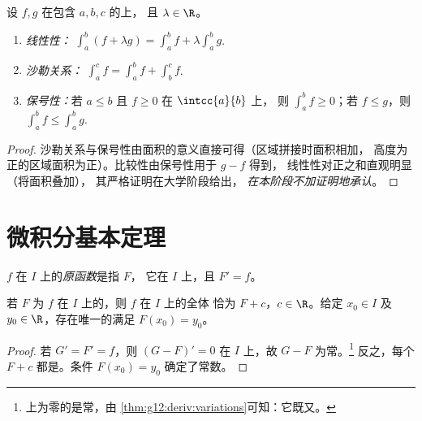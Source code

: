 \begin{proposition}[积分的性质]\label{prop:g12:integ:properties}
设 $f, g$ 在包含 $a, b, c$ 的上，
且 $\lambda \in \R$。
\begin{enumerate}
  \item \emph{线性性：}
        $\displaystyle\int_a^b (f + \lambda g) = \int_a^b f + \lambda \int_a^b g$.
  \item \emph{沙勒关系：}
        $\displaystyle\int_a^c f = \int_a^b f + \int_b^c f$.
  \item \emph{保号性：}若 $a \leq b$ 且 $f \geq 0$ 在 $\intcc{a}{b}$ 上，
        则 $\displaystyle\int_a^b f \geq 0$；若 $f \leq g$，则
        $\displaystyle\int_a^b f \leq \int_a^b g$.
\end{enumerate}
\end{proposition}

\begin{proof}
沙勒关系与保号性由面积的意义直接可得（区域拼接时面积相加，
高度为正的区域面积为正）。比较性由保号性用于 $g - f$ 得到，
线性性对正之和直观明显（将面积叠加），
其严格证明在大学阶段给出，
\emph{在本阶段不加证明地承认}。
\end{proof}

\section{微积分基本定理}

\begin{definition}[原函数]\label{def:g12:integ:primitive}
$f$ 在 $I$ 上的\emph{原函数}是指 $F$，
它在 $I$ 上，且 $F' = f$。
\end{definition}

\begin{proposition}\label{prop:g12:integ:primunique}
若 $F$ 为 $f$ 在 $I$ 上的，则 $f$ 在 $I$ 上的全体
恰为 $F + c$，$c \in \R$。给定 $x_0 \in I$ 及
$y_0 \in \R$，存在唯一的满足 $F(x_0) = y_0$。
\end{proposition}

\begin{proof}
若 $G' = F' = f$，则 $(G - F)' = 0$ 在 $I$ 上，故 $G - F$
为常。\footnote{上为零的是常，由
\cref{thm:g12:deriv:variations}可知：它既又。}
反之，每个 $F + c$ 都是。条件
$F(x_0) = y_0$ 确定了常数。
\end{proof}

